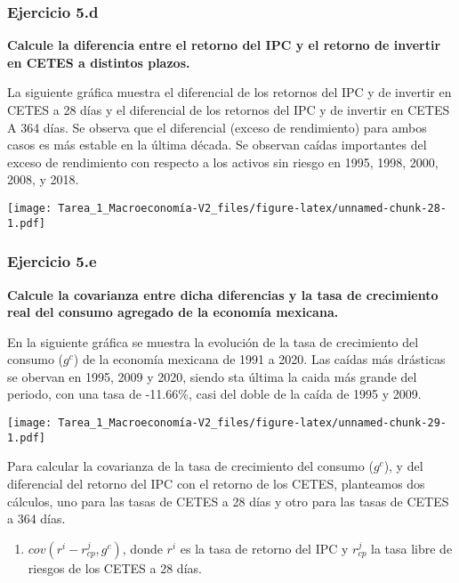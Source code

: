 \documentclass[
]{article}
\providecommand{\tightlist}{%
  \setlength{\itemsep}{0pt}\setlength{\parskip}{0pt}}
\begin{document}
\newpage

\hypertarget{ejercicio-5.d}{%
\subsubsection{Ejercicio 5.d}\label{ejercicio-5.d}}

\textbf{Calcule la diferencia entre el retorno del IPC y el retorno de
invertir en CETES a distintos plazos.}

La siguiente gráfica muestra el diferencial de los retornos del IPC y de
invertir en CETES a 28 días y el diferencial de los retornos del IPC y
de invertir en CETES A 364 días. Se observa que el diferencial (exceso
de rendimiento) para ambos casos es más estable en la última década. Se
observan caídas importantes del exceso de rendimiento con respecto a los
activos sin riesgo en 1995, 1998, 2000, 2008, y 2018.

\texttt{[image: Tarea\_1\_Macroeconomía-V2\_files/figure-latex/unnamed-chunk-28-1.pdf]}

\newpage

\hypertarget{ejercicio-5.e}{%
\subsubsection{Ejercicio 5.e}\label{ejercicio-5.e}}

\textbf{Calcule la covarianza entre dicha diferencias y la tasa de
crecimiento real del consumo agregado de la economía mexicana.}

En la siguiente gráfica se muestra la evolución de la tasa de
crecimiento del consumo (\(g^c\)) de la economía mexicana de 1991 a
2020. Las caídas más drásticas se obervan en 1995, 2009 y 2020, siendo
sta última la caida más grande del periodo, con una tasa de -11.66\%,
casi del doble de la caída de 1995 y 2009.

\texttt{[image: Tarea\_1\_Macroeconomía-V2\_files/figure-latex/unnamed-chunk-29-1.pdf]}

Para calcular la covarianza de la tasa de crecimiento del consumo
(\(g^c\)), y del diferencial del retorno del IPC con el retorno de los
CETES, planteamos dos cálculos, uno para las tasas de CETES a 28 días y
otro para las tasas de CETES a 364 días.

\begin{enumerate}
\def\labelenumi{\roman{enumi})}
\tightlist
\item
  \(cov(r^i-r_{cp}^j, g^c)\), donde \(r^i\) es la tasa de retorno del
  IPC y \(r_{cp}^j\) la tasa libre de riesgos de los CETES a 28 días.
\end{enumerate}
\end{document}
